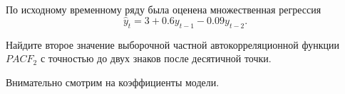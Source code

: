 
\begin{question}
По исходному временному ряду была оценена множественная регрессия
\[
\hat y_t = 3 + 0.6 y_{t-1} - 0.09 y_{t-2}.
\]

Найдите второе значение выборочной частной автокорреляционной функции \(PACF_2\) с точностью до двух знаков после десятичной точки.
\end{question}

\begin{solution}
Внимательно смотрим на коэффициенты модели.
\end{solution}

